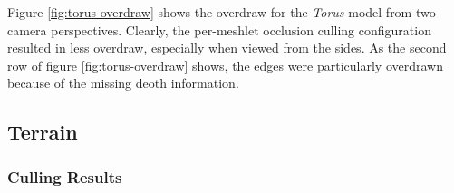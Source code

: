 \noindent
Figure \ref{fig:torus-overdraw} shows the overdraw for the \emph{Torus} model from two 
camera perspectives. Clearly, the per-meshlet occlusion culling configuration resulted 
in less overdraw, especially when viewed from the sides. As the second row of figure 
\ref{fig:torus-overdraw} shows, the edges were particularly overdrawn because of the 
missing deoth information.

\clearpage




\subsection*{Terrain}

\subsubsection*{Culling Results} \label{subsubsec-culling-results-terrain}


